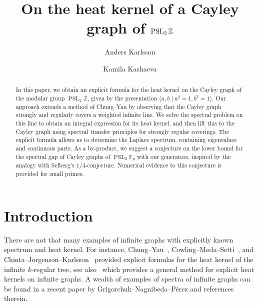 \documentclass[11pt]{amsart}
\title{On the heat kernel of a Cayley graph of $\operatorname{PSL}_2\Z$}
\author{Anders Karlsson}%
\author{Kamila Kashaeva}%
\date{}
\newcommand{\Z}{\mathbb{Z}}
\theoremstyle{definition}
\theoremstyle{remark}
\theoremstyle{plain}
\numberwithin{equation}{section}
\numberwithin{lemma}{section}
\numberwithin{definition}{section}
\numberwithin{proposition}{section}
\numberwithin{corollary}{section}
\numberwithin{theorem}{section}
\numberwithin{remark}{section}
\begin{document}
\maketitle

\begin{abstract}
In this paper, we obtain an explicit formula for the heat kernel on the Cayley graph of the modular group $\operatorname{PSL}_2\Z$, given by the presentation $\langle a,b\mid a^2=1,  b^3=1\rangle$. Our approach extends a method of Chung--Yau by observing that the Cayley graph strongly and regularly covers a weighted infinite line. We solve the spectral problem on this line to obtain an integral expression for its heat kernel, and then lift this to the Cayley graph using spectral transfer principles for strongly regular coverings. The explicit formula allows us to determine the Laplace spectrum, containing eigenvalues and continuous parts. As a by-product, we suggest a conjecture on the lower bound for the spectral gap of Cayley graphs of $\operatorname{PSL}_2\mathbb{F}_p$ with our generators, inspired by the analogy with Selberg's $1/4$-conjecture. Numerical evidence to this conjecture is provided for small primes.
\end{abstract}

\section{Introduction}
There are not that many examples of infinite graphs with explicitly known spectrum and heat kernel. For instance, Chung–Yau~\cite{MR1667452}, Cowling--Meda--Setti~\cite{MR1653343}, 
and Chinta–Jorgenson--Karlsson~\cite{MR3394421} provided explicit formulas for the heat kernel of the infinite $k$-regular tree, see also~\cite{MR5005075} which provides a general method for explicit heat kernels on infinite graphs. A wealth of examples of spectra of infinite graphs can be found in a recent paper by Grigorchuk--Nagnibeda--Pérez \cite{MR4458570} and references therein. 
\end{document}

